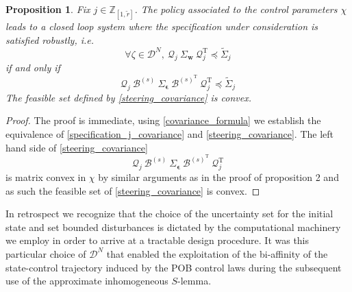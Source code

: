 \documentclass[letterpaper,11pt]{article}
\newcommand{\T}{\mathrm{T}}
\newtheorem{proposition}[theorem]{Proposition}
\newtheorem{proof}{Proof}
\begin{document}
\begin{proposition}
	Fix $j \in \mathbb{Z}_{[1,\tilde{r}]}$.
	The policy associated to the control parameters 
	$ \chi$  
	leads to a closed loop system where the specification under consideration is satisfied robustly, i.e.
	\begin{equation}
	\label{specification_j_covariance}
	\forall   \zeta \in \mathscr{D}^N, ~  \mathcal{Q}_j  ~ \Sigma_\mathbf{w}  ~  \mathcal{Q}_j^\T \preceq \tilde{\Sigma}_j
	\end{equation}
if and only if 
\begin{equation}
\label{steering_covariance}
 \mathcal{Q}_j  ~ \bm{\mathcal{B}}^{(s)} ~ 
 \Sigma_{\bm{\epsilon}}~ \bm{\mathcal{B}}^{{(s)}^{\T}}  ~  \mathcal{Q}_j^\T \preceq \tilde{\Sigma}_j
\end{equation}
	The feasible set defined by 
	\eqref{steering_covariance} is convex. 

\end{proposition}
\begin{proof}
	The proof is immediate, using \eqref{covariance_formula}
we establish the equivalence of \eqref{specification_j_covariance} and \eqref{steering_covariance}. The left hand side of
\eqref{steering_covariance} 
$$
\mathcal{Q}_j  ~ \bm{\mathcal{B}}^{(s)} ~ 
\Sigma_{\bm{\epsilon}}~ \bm{\mathcal{B}}^{{(s)}^{\T}}  ~  \mathcal{Q}_j^\T
$$	
is matrix convex in $\chi$ by similar arguments as in the proof of proposition 2 and as such the 
feasible set of  \eqref{steering_covariance} is convex. 	
\end{proof}
In retrospect we recognize that 
the choice of the uncertainty set for the initial state and set bounded disturbances is dictated by the computational machinery we employ in order to 
arrive at a tractable design procedure. 
It was this particular choice of $ \mathscr{D}^N$ that enabled the exploitation of  
the bi-affinity of the state-control trajectory induced by the POB control laws during the subsequent use of the approximate inhomogeneous $S$-lemma. 
\end{document}
